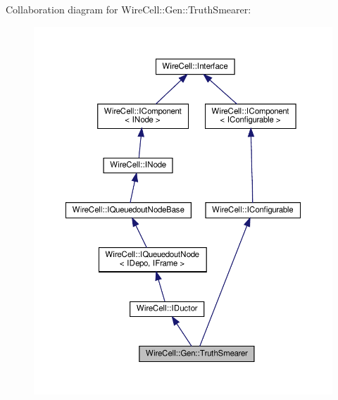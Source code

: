 Collaboration diagram for Wire\+Cell\+:\+:Gen\+:\+:Truth\+Smearer\+:
\nopagebreak
\begin{figure}[H]
\begin{center}
\leavevmode
\includegraphics[width=350pt]{class_wire_cell_1_1_gen_1_1_truth_smearer__coll__graph}
\end{center}
\end{figure}
